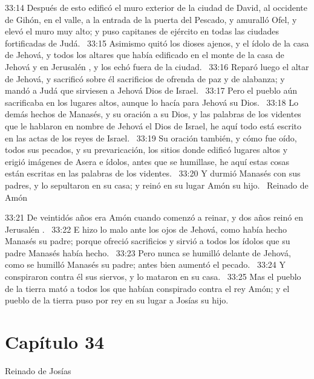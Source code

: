 																																	33:14 Después de esto edificó el muro exterior de la ciudad de David, al occidente de Gihón, en el valle, a la entrada de la puerta del Pescado, y amuralló Ofel, y elevó el muro muy alto; y puso capitanes de ejército en todas las ciudades fortificadas de Judá.  
																																	33:15 Asimismo quitó los dioses ajenos, y el ídolo de la casa de Jehová, y todos los altares que había edificado en el monte de la casa de Jehová y en Jerusalén , y los echó fuera de la ciudad.  
																																	33:16 Reparó luego el altar de Jehová, y sacrificó sobre él sacrificios de ofrenda de paz y de alabanza; y mandó a Judá que sirviesen a Jehová Dios de Israel.  
																																	33:17 Pero el pueblo aún sacrificaba en los lugares altos, aunque lo hacía para Jehová su Dios.  
																																	33:18 Lo demás hechos de Manasés, y su oración a su Dios, y las palabras de los videntes que le hablaron en nombre de Jehová el Dios de Israel, he aquí todo está escrito en las actas de los reyes de Israel.  
																																	33:19 Su oración también, y cómo fue oído, todos sus pecados, y su prevaricación, los sitios donde edificó lugares altos y erigió imágenes de Asera e ídolos, antes que se humillase, he aquí estas cosas están escritas en las palabras de los videntes.  
																																	33:20 Y durmió Manasés con sus padres, y lo sepultaron en su casa; y reinó en su lugar Amón su hijo.  
																																	Reinado de Amón 
																																	
																																	33:21 De veintidós años era Amón cuando comenzó a reinar, y dos años reinó en Jerusalén .  
																																	33:22 E hizo lo malo ante los ojos de Jehová, como había hecho Manasés su padre; porque ofreció sacrificios y sirvió a todos los ídolos que su padre Manasés había hecho.  
																																	33:23 Pero nunca se humilló delante de Jehová, como se humilló Manasés su padre; antes bien aumentó el pecado.  
																																	33:24 Y conspiraron contra él sus siervos, y lo mataron en su casa.  
																																	33:25 Mas el pueblo de la tierra mató a todos los que habían conspirado contra el rey Amón; y el pueblo de la tierra puso por rey en su lugar a Josías su hijo.  
																																	\section*{Capítulo 34}
																																		Reinado de Josías 
																																		
